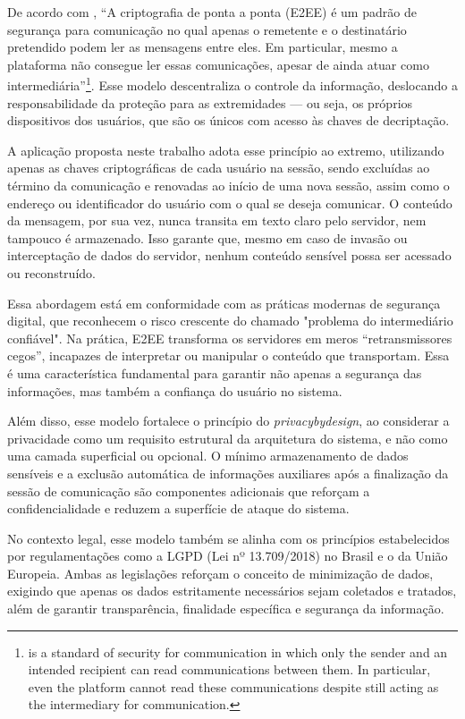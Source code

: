 De acordo com , “A
criptografia de ponta a ponta (\acs{E2EE}) é um padrão de segurança para
comunicação no qual apenas o remetente e o destinatário pretendido
podem ler as mensagens entre eles. Em particular, mesmo a plataforma
não consegue ler essas comunicações, apesar de ainda atuar como
intermediária”\footnote{ is a standard
  of security for communication in which only the sender and an
  intended recipient can read communications between them. In
  particular, even the platform cannot read these communications
despite still acting as the intermediary for communication.}. Esse
modelo descentraliza o controle da informação, deslocando a
responsabilidade da proteção para as extremidades — ou seja, os
próprios dispositivos dos usuários, que são os únicos com acesso às
chaves de decriptação.

A aplicação proposta neste trabalho adota esse princípio ao extremo,
utilizando apenas as chaves criptográficas de cada usuário na
sessão, sendo excluídas ao término da comunicação e renovadas ao
início de uma nova sessão, assim como o endereço ou identificador do
usuário com o qual se deseja comunicar. O conteúdo da mensagem, por
sua vez, nunca transita em texto claro pelo servidor, nem tampouco
é armazenado. Isso garante que, mesmo em caso de invasão ou
interceptação de dados do servidor, nenhum conteúdo sensível possa
ser acessado ou reconstruído.

Essa abordagem está em conformidade com as práticas modernas de
segurança digital, que reconhecem o risco crescente do chamado
"problema do intermediário confiável". Na prática, \acs{E2EE}
transforma os servidores em meros “retransmissores cegos”,
incapazes de interpretar ou manipular o conteúdo que transportam.
Essa é uma característica fundamental para garantir não apenas a
segurança das informações, mas também a confiança do usuário no sistema.

Além disso, esse modelo fortalece o princípio do \textit{\gls{privacybydesign}},
ao considerar a privacidade como um requisito estrutural da
arquitetura do sistema, e não como uma camada superficial ou
opcional. O mínimo armazenamento de dados sensíveis e a exclusão
automática de informações auxiliares após a finalização da sessão de
comunicação são componentes adicionais que reforçam a
confidencialidade e reduzem a superfície de ataque do sistema.

No contexto legal, esse modelo também se alinha com os princípios
estabelecidos por regulamentações como a \acs{LGPD} (Lei nº
13.709/2018) no Brasil e o  da União Europeia.
Ambas as legislações reforçam o conceito
de minimização de dados, exigindo que apenas os dados
estritamente necessários sejam coletados e tratados, além de garantir
transparência, finalidade específica e segurança da informação.

